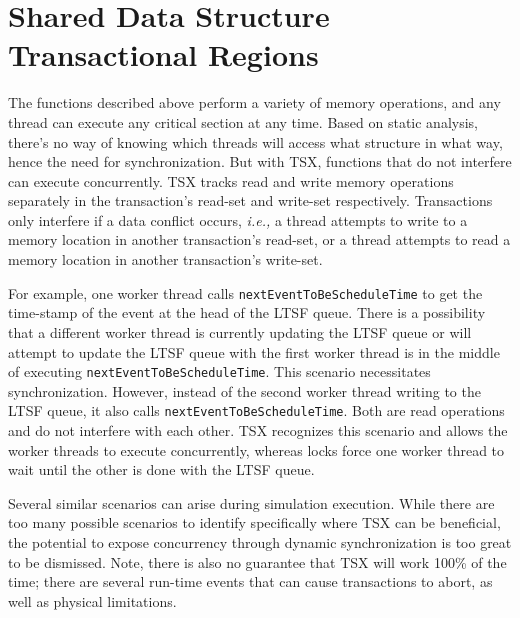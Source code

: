 \documentclass[11pt]{book}
\begin{document}
\section{Shared Data Structure Transactional Regions}

The functions described above perform a variety of memory operations, and any thread can
execute any critical section at any time.  Based on static analysis, there's no way of
knowing which threads will access what structure in what way, hence the need for
synchronization.  But with TSX, functions that do not interfere can execute concurrently.
TSX tracks read and write memory operations separately in the transaction's read-set and
write-set respectively.  Transactions only interfere if a data conflict occurs, \emph{i.e.,} a
thread attempts to write to a memory location in another transaction's read-set, or a
thread attempts to read a memory location in another transaction's write-set.

For example, one worker thread calls \texttt{nextEventToBeScheduleTime} to get the
time-stamp of the event at the head of the LTSF queue.  There is a possibility that a
different worker thread is currently updating the LTSF queue or will attempt to update the
LTSF queue with the first worker thread is in the middle of executing
\texttt{nextEventToBeScheduleTime}.  This scenario necessitates synchronization.  However,
instead of the second worker thread writing to the LTSF queue, it also calls
\texttt{nextEventToBeScheduleTime}.  Both are read operations and do not interfere with
each other.  TSX recognizes this scenario and allows the worker threads to execute
concurrently, whereas locks force one worker thread to wait until the other is done with
the LTSF queue.

Several similar scenarios can arise during simulation execution. While there are too many
possible scenarios to identify specifically where TSX can be beneficial, the potential to
expose concurrency through dynamic synchronization is too great to be dismissed. Note,
there is also no guarantee that TSX will work 100\% of the time; there are several
run-time events that can cause transactions to abort, as well as physical limitations.
\end{document}
